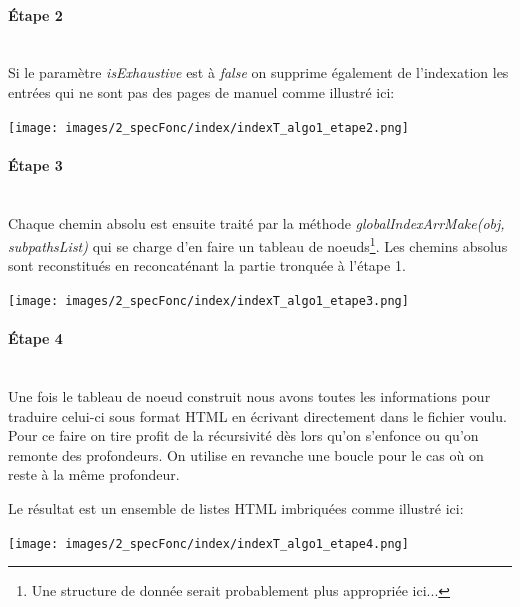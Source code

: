 \documentclass[./standalone.tex]{subfiles}
\begin{document}
\newpage
\paragraph{Étape 2\\\\}
Si le paramètre \textit{isExhaustive} est à \textit{false} on supprime également de l'indexation les entrées qui ne sont pas des pages de manuel comme illustré ici:\\
\begin{center}
	\texttt{[image: images/2\_specFonc/index/indexT\_algo1\_etape2.png]}
	\label{fig:indexT_algo1_etape2}
\end{center}

\newpage
\paragraph{Étape 3\\\\}
Chaque chemin absolu est ensuite traité par la méthode \textit{globalIndexArrMake(obj, subpathsList)} qui se charge d'en faire un tableau de noeuds\footnote{Une structure de donnée serait probablement plus appropriée ici...}. Les chemins absolus sont reconstitués en reconcaténant la partie tronquée à l'étape 1.
\begin{center}
	\texttt{[image: images/2\_specFonc/index/indexT\_algo1\_etape3.png]}
	\label{fig:indexT_algo1_etape2}
\end{center}

\newpage
\paragraph{Étape 4\\\\}

Une fois le tableau de noeud construit nous avons toutes les informations pour traduire celui-ci sous format HTML en écrivant directement dans le fichier voulu. Pour ce faire on tire profit de la récursivité dès lors qu'on s'enfonce ou qu'on remonte des profondeurs. On utilise en revanche une boucle pour le cas où on reste à la même profondeur.

Le résultat est un ensemble de listes HTML imbriquées comme illustré ici:
\begin{center}
	\texttt{[image: images/2\_specFonc/index/indexT\_algo1\_etape4.png]}
	\label{fig:indexT_algo1_etape2}
\end{center}
\end{document}
